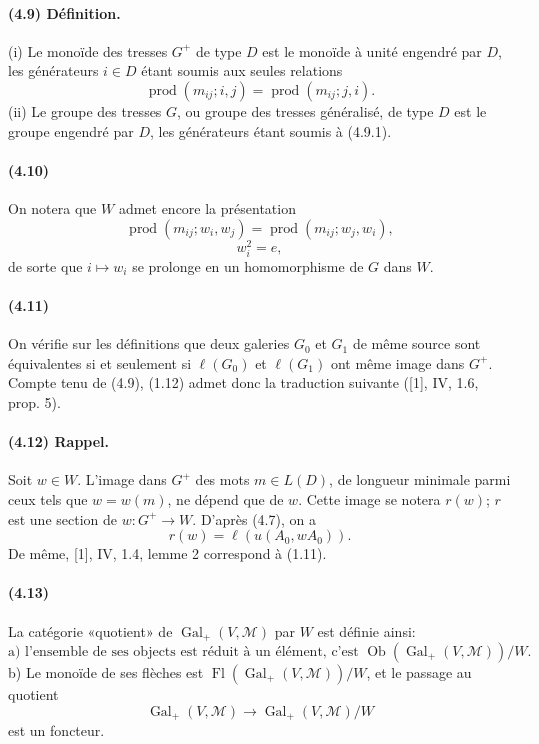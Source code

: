 \documentclass[10pt,a4paper]{article}
\newcommand{\prodalt}{\operatorname{prod}}
\begin{document}
\paragraph{(4.9) Définition.} (i) Le monoïde des tresses \(G^+\) de type \(D\) est le monoïde à unité engendré par \(D\), les générateurs \(i\in D\) étant soumis aux seules relations
\[
\tag{4.9.1}
\prodalt(m_{ij};i,j)=\prodalt(m_{ij};j,i).
\]
(ii) Le groupe des tresses \(G\), ou groupe des tresses généralisé, de type \(D\) est le groupe engendré par \(D\), les générateurs étant soumis à (4.9.1).

\paragraph{(4.10)} On notera que \(W\) admet encore la présentation
\[
\tag{4.10.1}
\prodalt(m_{ij};w_i,w_j)=\prodalt(m_{ij};w_j,w_i),
\]
\[
\tag{4.10.2}
w_i^2=e,
\]
de sorte que \(i\mapsto w_i\) se prolonge en un homomorphisme de \(G\) dans \(W\).

\paragraph{(4.11)} On vérifie sur les définitions que deux galeries \(G_0\) et \(G_1\) de même source sont équivalentes si et seulement si \(\ell(G_0)\) et \(\ell(G_1)\) ont même image dans \(G^+\). Compte tenu de (4.9), (1.12) admet donc la traduction suivante ([1], IV, 1.6, prop. 5).

\paragraph{(4.12) Rappel.} Soit \(w\in W\). L'image dans \(G^+\) des mots \(m\in L(D)\), de longueur minimale parmi ceux tels que \(w=w(m)\), ne dépend que de \(w\). Cette image se notera \(r(w)\); \(r\) est une section de \(w:G^+\to W\). D'après (4.7), on a
\[
r(w)=\ell(u(A_0,wA_0)).
\]
De même, [1], IV, 1.4, lemme 2 correspond à (1.11).

\paragraph{(4.13)} La catégorie «quotient» de \(\operatorname{Gal}_+(V,\mathcal M)\) par \(W\) est définie ainsi:
\[
\text{a) l'ensemble de ses objects est réduit à un élément, c'est }
\operatorname{Ob}(\operatorname{Gal}_+(V,\mathcal M))/W.
\]
b) Le monoïde de ses flèches est \(\operatorname{Fl}(\operatorname{Gal}_+(V,\mathcal M))/W\), et le passage au quotient
\[
\operatorname{Gal}_+(V,\mathcal M)\longrightarrow
\operatorname{Gal}_+(V,\mathcal M)/W
\]
est un foncteur.
\end{document}
